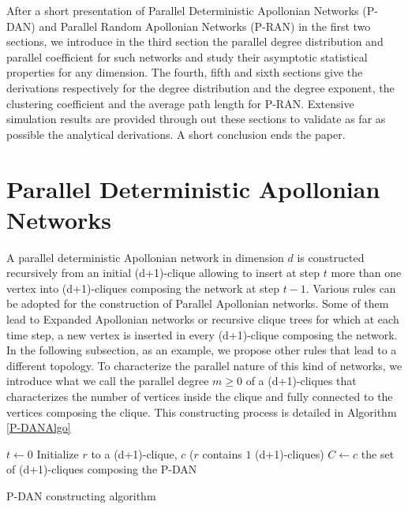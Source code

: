 \documentclass[11pt]{iopart}
\begin{document}
After a short presentation of Parallel Deterministic Apollonian Networks (P-DAN) and Parallel Random Apollonian Networks (P-RAN) in the first two sections, we introduce in the third section the parallel degree distribution and parallel coefficient for such networks and study their asymptotic statistical properties for any dimension. The fourth, fifth and sixth  sections give the derivations respectively for the degree distribution and the degree exponent, the clustering coefficient and the average path length for P-RAN. Extensive simulation results are provided through out these sections to validate as far as possible the analytical derivations. A short conclusion ends the paper.


\section{Parallel Deterministic Apollonian Networks}
\label{Parallel Apollonian Networks}
A parallel deterministic Apollonian network in dimension $d$ is constructed recursively from an initial (d+1)-clique allowing to insert at step $t$ more than one vertex into (d+1)-cliques composing the network at step $t-1$. Various rules can be adopted for the construction of Parallel Apollonian networks. Some of them lead to Expanded Apollonian networks \cite{zhang-2006} or recursive clique trees \cite{citeulike:2215346} for which at each time step, a new vertex is inserted in every (d+1)-clique composing the network. In the following subsection, as an example, we propose other rules that lead to a different topology. To characterize the parallel nature of this kind of networks, we introduce what we call the parallel degree $m \ge 0$ of a (d+1)-cliques that characterizes the number of vertices inside the clique and fully connected to the vertices composing the clique. This constructing process is detailed in Algorithm \ref{P-DANAlgo} 

\begin{algorithm}[H]
  \SetLine
  $t \leftarrow 0$\;
  Initialize $r$ to a (d+1)-clique, $c$ ($r$ contains $1$ (d+1)-cliques)\; 
  $C \leftarrow {c}$ the set of (d+1)-cliques composing the P-DAN \;
  
  \caption{P-DAN constructing algorithm}
  \label{P-DANAlgo}
\end{algorithm}
\end{document}
